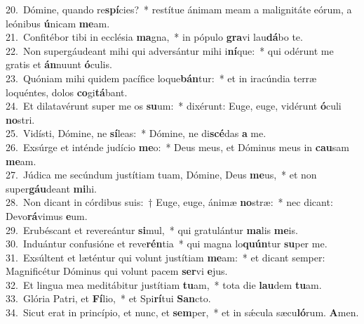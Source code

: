 {20.~}Dómine, quando re\textbf{spí}cies?~* restítue ánimam meam a malignitáte eórum, a leónibus \textbf{ú}nicam \textbf{me}am.\\
{21.~}Confitébor tibi in ecclésia \textbf{ma}gna,~* in pópulo \textbf{gra}vi lau\textbf{dá}bo te.\\
{22.~}Non supergáudeant mihi qui adversántur mihi i\textbf{ní}que:~* qui odérunt me gratis et \textbf{án}nuunt \textbf{ó}culis.\\
{23.~}Quóniam mihi quidem pacífice loque\textbf{bán}tur:~* et in iracúndia terræ loquéntes, dolos \textbf{co}gi\textbf{tá}bant.\\
{24.~}Et dilatavérunt super me os \textbf{su}um:~* dixérunt: Euge, euge, vidérunt \textbf{ó}culi \textbf{no}stri.\\
{25.~}Vidísti, Dómine, ne \textbf{sí}leas:~* Dómine, ne di\textbf{scé}das \textbf{a} me.\\
{26.~}Exsúrge et inténde judício \textbf{me}o:~* Deus meus, et Dóminus meus in \textbf{cau}sam \textbf{me}am.\\
{27.~}Júdica me secúndum justítiam tuam, Dómine, Deus \textbf{me}us,~* et non super\textbf{gáu}deant \textbf{mi}hi.\\
{28.~}Non dicant in córdibus suis:~† Euge, euge, ánimæ \textbf{no}stræ:~* nec dicant: Devo\textbf{rá}vimus \textbf{e}um.\\
{29.~}Erubéscant et revereántur \textbf{si}mul,~* qui gratulántur \textbf{ma}lis \textbf{me}is.\\
{30.~}Induántur confusióne et reve\textbf{rén}tia~* qui magna lo\textbf{quún}tur \textbf{su}per me.\\
{31.~}Exsúltent et læténtur qui volunt justítiam \textbf{me}am:~* et dicant semper: Magnificétur Dóminus qui volunt pacem \textbf{ser}vi \textbf{e}jus.\\
{32.~}Et lingua mea meditábitur justítiam \textbf{tu}am,~* tota die \textbf{lau}dem \textbf{tu}am.\\
{33.~}Glória Patri, et \textbf{Fí}lio,~* et Spi\textbf{rí}tui \textbf{San}cto.\\
{34.~}Sicut erat in princípio, et nunc, et \textbf{sem}per,~* et in sǽcula sæcu\textbf{ló}rum. \textbf{A}men.\\
